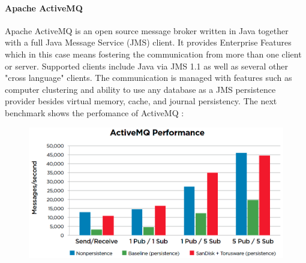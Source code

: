 \paragraph{Apache ActiveMQ}
\label{sec:sec01}
Apache ActiveMQ is an open source message broker written in Java together with a full Java Message Service (JMS) client.
It provides Enterprise Features which in this case means fostering the communication from more than one client or server.
 Supported clients include Java via JMS 1.1 as well as several other "cross language" clients. 
 The communication is managed with features such as computer clustering and ability to use any database as a 
 JMS persistence provider besides virtual memory, cache, and journal persistency. The next benchmark shows the perfomance of ActiveMQ :
 \begin{figure}[h!]
	\centering
	\includegraphics[height=0.3\textheight]{fig01/ActiveMQ}
	\label{fig:FilialesEtClients}
\end{figure}

